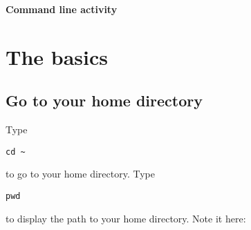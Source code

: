 \documentclass[12pt]{article}
\begin{document}
\begin{center}
\Large{\textbf{Command line activity}}\\
\end{center}

\section{The basics}
\subsection{Go to your home directory}
Type 
\begin{verbatim}
cd ~
\end{verbatim}
to go to your home directory. Type 
\begin{verbatim}
pwd
\end{verbatim}
to display the path to your home directory. Note it here:
\vspace{.2in}
\end{document}

